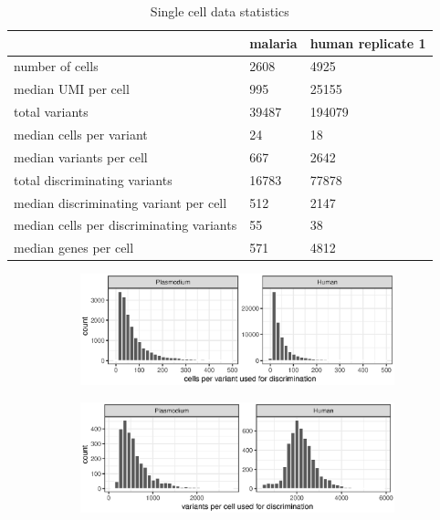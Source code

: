 \begin{table}[h!]
\caption{Single cell data statistics}
\label{table:scdatatable}
\begin{center}
\begin{tabular}{ | l | l | l | } 
 \hline
  & malaria & human replicate 1 \\ 
  \hline
  number of cells & 2608 & 4925  \\
 \hline
  median UMI per cell & 995 & 25155  \\ 
 \hline
 total variants & 39487 & 194079 \\
 \hline
 median cells per variant & 24 & 18 \\
 \hline
 median variants per cell & 667 & 2642  \\ 
 \hline
 total discriminating variants & 16783 & 77878 \\
  \hline
 median discriminating variant per cell & 512 & 2147 \\
 \hline
 median cells per discriminating variants & 55 & 38 \\
 \hline
 median genes per cell & 571 & 4812 \\
 \hline
 
\end{tabular}
\end{center}
\end{table}

\begin{figure}[h!]
\caption{Single cell sparsity}
\label{figure:scdatafigure}
\begin{centering}
\begin{subfigure}[b]{\textwidth}
\includegraphics[width=\textwidth]{Cells_per_variant.eps}
\end{subfigure}
\begin{subfigure}[b]{\textwidth}
\includegraphics[width=\textwidth]{Variants_per_cell.eps}
\end{subfigure}
\end{centering}
\end{figure}

